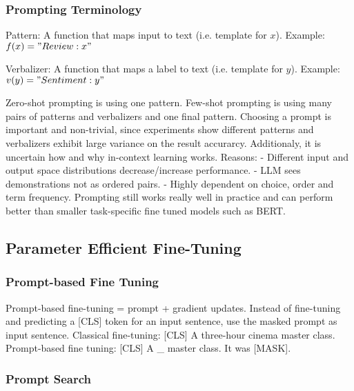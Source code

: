\documentclass{scrartcl}
\begin{document}
\subsubsection*{Prompting Terminology}

Pattern:
A function that maps input to text (i.e. template for $x$).
Example: $f(x) = "Review: x"$

Verbalizer:
A function that maps a label to text (i.e. template for $y$).
Example: $v(y) = "Sentiment: y"$

Zero-shot prompting is using one pattern. Few-shot prompting is using many pairs of patterns and verbalizers and one final pattern.
Choosing a prompt is important and non-trivial, since experiments show different patterns and verbalizers exhibit large variance on the result accurarcy. Additionaly, it is uncertain how and why in-context learning works.
Reasons:
- Different input and output space distributions decrease/increase performance.
- LLM sees demonstrations not as ordered pairs.
- Highly dependent on choice, order and term frequency.
Prompting still works really well in practice and can perform better than smaller task-specific fine tuned models such as BERT.

\subsection*{Parameter Efficient Fine-Tuning}

\subsubsection*{Prompt-based Fine Tuning}
Prompt-based fine-tuning = prompt + gradient updates.
Instead of fine-tuning and predicting a [CLS] token for an input sentence, use the masked prompt as input sentence.
Classical fine-tuning: [CLS] A three-hour cinema master class.
Prompt-based fine tuning: [CLS] A \_ master class. It was [MASK].

\subsubsection*{Prompt Search}
\end{document}
